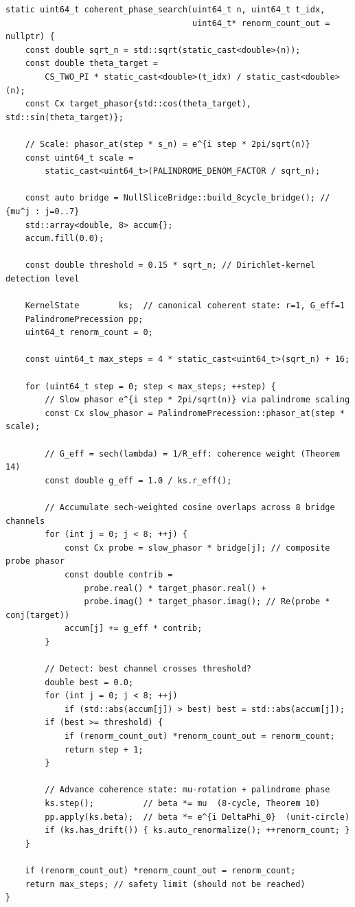 \documentclass[12pt,a4paper]{article}
\theoremstyle{plain}
\theoremstyle{definition}
\theoremstyle{remark}
\begin{document}
\begin{lstlisting}[caption={Core Theta(sqrt(n)) coherent phase search.
The slow phasor is scaled to DeltaPhi = 2pi/sqrt(n) per step.
The NullSliceBridge provides 8-channel coverage.
G\_eff = sech(lambda) weights each contribution by current coherence.},
                   label={lst:search}]
static uint64_t coherent_phase_search(uint64_t n, uint64_t t_idx,
                                      uint64_t* renorm_count_out = nullptr) {
    const double sqrt_n = std::sqrt(static_cast<double>(n));
    const double theta_target =
        CS_TWO_PI * static_cast<double>(t_idx) / static_cast<double>(n);
    const Cx target_phasor{std::cos(theta_target), std::sin(theta_target)};

    // Scale: phasor_at(step * s_n) = e^{i step * 2pi/sqrt(n)}
    const uint64_t scale =
        static_cast<uint64_t>(PALINDROME_DENOM_FACTOR / sqrt_n);

    const auto bridge = NullSliceBridge::build_8cycle_bridge(); // {mu^j : j=0..7}
    std::array<double, 8> accum{};
    accum.fill(0.0);

    const double threshold = 0.15 * sqrt_n; // Dirichlet-kernel detection level

    KernelState        ks;  // canonical coherent state: r=1, G_eff=1
    PalindromePrecession pp;
    uint64_t renorm_count = 0;

    const uint64_t max_steps = 4 * static_cast<uint64_t>(sqrt_n) + 16;

    for (uint64_t step = 0; step < max_steps; ++step) {
        // Slow phasor e^{i step * 2pi/sqrt(n)} via palindrome scaling
        const Cx slow_phasor = PalindromePrecession::phasor_at(step * scale);

        // G_eff = sech(lambda) = 1/R_eff: coherence weight (Theorem 14)
        const double g_eff = 1.0 / ks.r_eff();

        // Accumulate sech-weighted cosine overlaps across 8 bridge channels
        for (int j = 0; j < 8; ++j) {
            const Cx probe = slow_phasor * bridge[j]; // composite probe phasor
            const double contrib =
                probe.real() * target_phasor.real() +
                probe.imag() * target_phasor.imag(); // Re(probe * conj(target))
            accum[j] += g_eff * contrib;
        }

        // Detect: best channel crosses threshold?
        double best = 0.0;
        for (int j = 0; j < 8; ++j)
            if (std::abs(accum[j]) > best) best = std::abs(accum[j]);
        if (best >= threshold) {
            if (renorm_count_out) *renorm_count_out = renorm_count;
            return step + 1;
        }

        // Advance coherence state: mu-rotation + palindrome phase
        ks.step();          // beta *= mu  (8-cycle, Theorem 10)
        pp.apply(ks.beta);  // beta *= e^{i DeltaPhi_0}  (unit-circle)
        if (ks.has_drift()) { ks.auto_renormalize(); ++renorm_count; }
    }

    if (renorm_count_out) *renorm_count_out = renorm_count;
    return max_steps; // safety limit (should not be reached)
}
\end{lstlisting}
\end{document}
